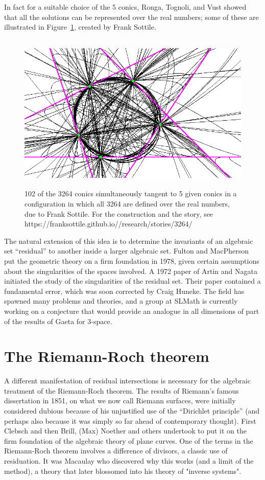 \documentclass[11pt, oneside]{article}   	%
\begin{document}
In fact for a suitable choice of the 5 conics, 
 Ronga, Tognoli, and Vust showed that all the solutions can be represented over the real numbers; 
 some of these are illustrated in Figure~\ref{102Conics}, created by Frank Sottile. 
\begin{figure}\label{102Conics}
\centerline {\includegraphics[height=3in]{102_conics.png}}
 \caption{102 of the 3264 conics simultaneously tangent to 5 given conics in 
 a configuration in which all 3264 are defined over the real numbers, due to 
 Frank Sottile. For the construction and the story, see 
 https://franksottile.github.io//research/stories/3264/}
\end{figure}

The natural extension of this idea is to determine the invariants of an algebraic set ``residual'' to another inside a larger algebraic set. Fulton and MacPherson put the geometric theory on a firm foundation in 1978, given certain assumptions about the singularities of the spaces involved. A 1972 paper of Artin and Nagata initiated the study of the singularities of the residual set. Their paper contained a fundamental error, which was soon corrected by Craig Huneke. The field has spawned many problems and theories, and a group at SLMath is currently working on a conjecture that would provide an analogue in all dimensions of part of the results of Gaeta for 3-space.

\section{The Riemann-Roch theorem}
A different manifestation of residual intersections is necessary for the algebraic treatment of the Riemann-Roch theorem. The results of Riemann's famous dissertation in 1851, on what we now call Riemann surfaces, were initially considered
dubious because of his unjustified use of the ``Dirichlet principle'' (and perhaps also because it was simply so far ahead of contemporary thought). First Clebsch and then Brill, (Max) Noether and others undertook to put it on the firm foundation of the algebraic theory of plane curves. One of the terms in the Riemann-Roch theorem involves a difference of divisors, a classic use of residuation. It was Macaulay
who discovered why this works (and a limit of the method), a theory that later blossomed into his theory of "inverse systems".
\end{document}
